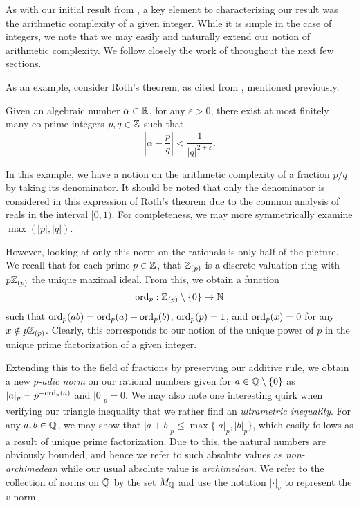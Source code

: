 As with our initial result from \cite{BCZ_2002}, 
a key element to characterizing our result was the arithmetic complexity of a given integer.
While it is simple in the case of integers, 
we note that we may easily and naturally extend our notion of arithmetic complexity.
We follow closely the work of \cite{Silverman_Hindry_2013} throughout the next few sections.

As an example, consider Roth's theorem, as cited from \cite{Silverman_Hindry_2013}, mentioned previously.

\begin{theorem}
    Given an algebraic number $\alpha \in \mathbb{R}$, for any $\varepsilon > 0$,
    there exist at most finitely many co-prime integers $p, q \in \mathbb{Z}$ such that
    \[
        \left|\alpha - \frac{p}{q}\right| < \frac{1}{|q|^{2 + \varepsilon}}.
    \]
\end{theorem}

In this example, we have a notion on the arithmetic complexity of a fraction $p/q$ by taking its denominator.
It should be noted that only the denominator is considered in this expression of Roth's theorem due to the common analysis of reals in the interval $[0, 1)$.
For completeness, we may more symmetrically examine $\max(|p|, |q|)$.

However, looking at only this norm on the rationals is only half of the picture.
We recall that for each prime $p \in \mathbb{Z}$, 
that $\mathbb{Z}_{(p)}$ is a discrete valuation ring with $p\mathbb{Z}_{(p)}$ the unique maximal ideal.
From this, we obtain a function
\[
    {\rm ord}_p : \mathbb{Z}_{(p)} \setminus \{0\} \to \mathbb{N}
\]
such that ${\rm ord}_p(ab) = {\rm ord}_p(a) + {\rm ord}_p(b)$, ${\rm ord}_p(p) = 1$, and ${\rm ord}_p(x) = 0$ for any $x \notin p\mathbb{Z}_{(p)}$.
Clearly, this corresponds to our notion of the unique power of $p$ in the unique prime factorization of a given integer.

Extending this to the field of fractions by preserving our additive rule,
we obtain a new \textit{$p$-adic norm} on our rational numbers given for $a \in \mathbb{Q} \setminus \{0\}$ as $|a|_p = p^{-{\rm ord}_p(a)}$ and $|0|_p = 0$.
We may also note one interesting quirk when verifying our triangle inequality that we rather find an \textit{ultrametric inequality}.
For any $a, b \in \mathbb{Q}$, we may show that $|a + b|_p \leq \max\{|a|_p, |b|_p\}$,
which easily follows as a result of unique prime factorization.
Due to this, the natural numbers are obviously bounded,
and hence we refer to such absolute values as \textit{non-archimedean} while our usual absolute value is \textit{archimedean}.
We refer to the collection of norms on $\mathbb{Q}$ by the set $M_{\mathbb{Q}}$ and use the notation $|\cdot|_v$ to represent the $v$-norm.


